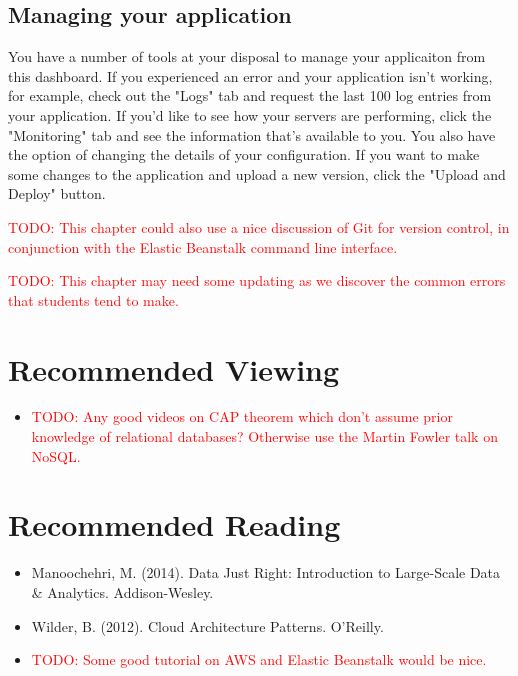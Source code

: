 \documentclass[11pt]{book}
\newcommand{\todo}[1]{\textcolor{red}{TODO: #1}} %
\begin{document}
\subsection*{Managing your application}

You have a number of tools at your disposal to manage your applicaiton from this dashboard.  If you experienced an error and your application isn't working, for example, check out the "Logs" tab and request the last 100 log entries from your application.  If you'd like to see how your servers are performing, click the "Monitoring" tab and see the information that's available to you.  You also have the option of changing the details of your configuration.  If you want to make some changes to the application and upload a new version, click the "Upload and Deploy" button.

\todo{This chapter could also use a nice discussion of Git for version control, in conjunction with the Elastic Beanstalk command line interface.}

\todo{This chapter may need some updating as we discover the common errors that students tend to make.}

\section*{Recommended Viewing}
\begin{itemize}
    \item \todo{Any good videos on CAP theorem which don't assume prior knowledge of relational databases?  Otherwise use the Martin Fowler talk on NoSQL.}
\end{itemize}

\section*{Recommended Reading}
\begin{itemize}
    \item Manoochehri, M. (2014). Data Just Right: Introduction to Large-Scale Data \& Analytics. Addison-Wesley.
    \item Wilder, B. (2012). Cloud Architecture Patterns. O'Reilly.
    \item \todo{Some good tutorial on AWS and Elastic Beanstalk would be nice.}
\end{itemize}
\end{document}
